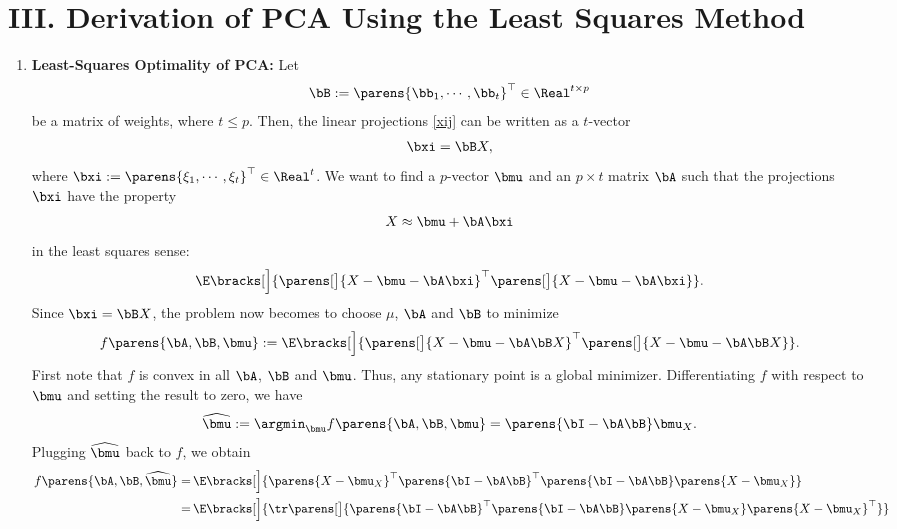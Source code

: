 \documentclass[12pt]{article}
\begin{document}
\section*{III. Derivation of PCA Using the Least Squares Method}

\begin{enumerate}[label=\textbf{\arabic*.}]

	\item \textbf{Least-Squares Optimality of PCA:} Let 
	\begin{align*}
		\bB := \parens{\bb_1, \cdots, \bb_t}^\top \in \Real^{t \times p}
	\end{align*}
	be a matrix of weights, where $t \le p$. Then, the linear projections \eqref{xij} can be written as a $t$-vector
	\begin{align*}
		\bxi = \bB X, 
	\end{align*}
	where $\bxi := \parens{\xi_1, \cdots, \xi_t}^\top \in \Real^t$. We want to find a $p$-vector $\bmu$ and an $p \times t$ matrix $\bA$ such that the projections $\bxi$ have the property 
	\begin{align*}
		X \approx \bmu + \bA \bxi
	\end{align*}
	in the least squares sense: 
	\begin{align}\label{ls_criterion}
		\E \bracks[\Big]{\parens[\big]{X - \bmu - \bA \bxi}^\top \parens[\big]{X - \bmu - \bA \bxi}}. 
	\end{align}
	Since $\bxi = \bB X$, the problem now becomes to choose $\mu$, $\bA$ and $\bB$ to minimize 
	\begin{align*}
		f \parens{\bA, \bB, \bmu} := \E \bracks[\Big]{\parens[\big]{X - \bmu - \bA \bB X}^\top \parens[\big]{X - \bmu - \bA \bB X}}. 
	\end{align*}
	First note that $f$ is convex in all $\bA$, $\bB$ and $\bmu$. Thus, any stationary point is a global minimizer. Differentiating $f$ with respect to $\bmu$ and setting the result to zero, we have 
	\begin{align*}
		\widehat{\bmu} := \argmin_{\bmu} f \parens{\bA, \bB, \bmu} = \parens{\bI - \bA \bB} \bmu_X. 
	\end{align*}
	Plugging $\widehat{\bmu}$ back to $f$, we obtain 
	\begin{align*}
		f \parens{\bA, \bB, \widehat{\bmu}} = & \, \E \bracks[\Big]{\parens{X - \bmu_X}^\top \parens{\bI - \bA \bB}^\top \parens{\bI - \bA \bB} \parens{X - \bmu_X}} \\ 
		= & \, \E \bracks[\Big]{ \tr \parens[\big]{\parens{\bI - \bA \bB}^\top \parens{\bI - \bA \bB} \parens{X - \bmu_X} \parens{X - \bmu_X}^\top }} \\ 

\end{align*}
\end{enumerate}
\end{document}
